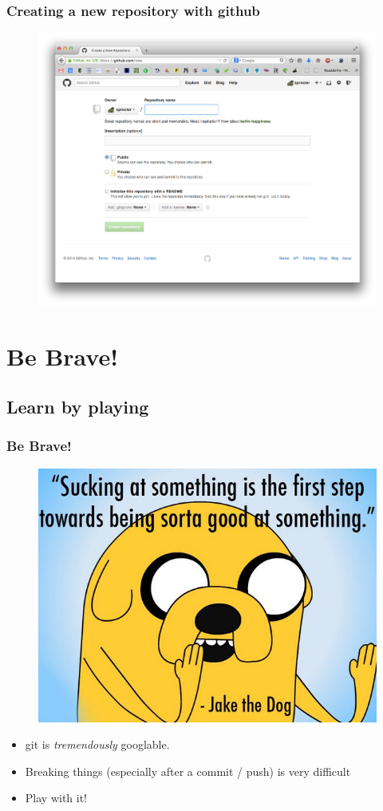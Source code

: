 \documentclass{beamer}
\begin{document}
\begin{frame}
\frametitle{Creating a new repository with github}

\begin{figure}[!t] \centering
\includegraphics[width=.8\textwidth]{figures/new-repo}
\end{figure}

\end{frame}

\section{Be Brave!}

\subsection[Learn by playing]{Learn by playing}

\begin{frame}
\frametitle{Be Brave!}
\begin{figure}[!t] \centering
\includegraphics[width=.4\textwidth]{figures/jake-quote}
\end{figure}
\begin{itemize}
\item git is \emph{tremendously} googlable.
\item Breaking things (especially after a commit / push) is very difficult
\item Play with it!
\end{itemize}
\end{frame}
\end{document}

